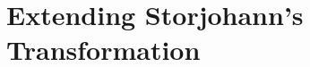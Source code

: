 
\section{Extending Storjohann's Transformation}

\label{sec:transform}

%
\begin{comment}
notations: 
\begin{itemize}
\item Matrices

\begin{itemize}
\item Polynomial matrices: bold capital $\mathbf{A,B,F,G,P,R}$

\begin{itemize}
\item $\mathbf{F}$: input matrix,

\begin{itemize}
\item $\bar{\mathbf{F}}$: Storjohann transformed matrix, 
\item $\check{\mathbf{F}}$: the transformation that extends $\bar{\mathbf{F}}$. 
\end{itemize}
\item $\mathbf{G}$: input matrix for the second subproblem. 
\end{itemize}
\item scalar matrices: non-bold Capital, used to distinguish coefficient
matrix 
\item Identity matrix: $\mathbf{I}$ this is to be consistent with polynomial
matrices, as identity is considered as an important element of polynomial
matrices. 
\end{itemize}
\item order

\begin{itemize}
\item $\sigma,\omega$ 
\end{itemize}
\item vectors

\begin{itemize}
\item polynomial vectors: $\mathbf{p,q,r,s,t}$ 
\item $\mathbf{p}$: element in basis $\mathbf{P}$ 
\item $\mathbf{q}:$ some test element in $\left\langle \left(\mathbf{F},\sigma\right)\right\rangle $ 
\item $\bar{\mathbf{t}}$: test element in $\left\langle \left(\check{\mathbf{F}},\vec{\omega}\right)\right\rangle $ 
\end{itemize}
\item shifts:


\end{comment}
